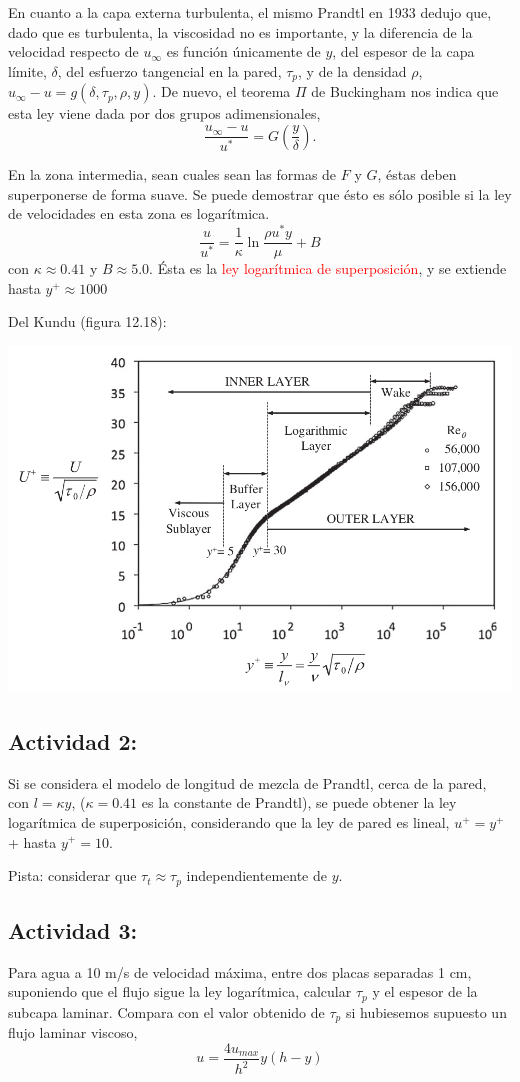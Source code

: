 	
	En cuanto a la capa externa turbulenta, el mismo Prandtl en 1933 dedujo
	que, dado que es turbulenta, la viscosidad no es importante, y la
	diferencia de la velocidad respecto de ${u}_{\infty}$ es función
	únicamente de $y$, del espesor de la capa límite, $\delta$, del
	esfuerzo tangencial en la pared, $\tau_{p}$, y de la densidad $\rho$,
	${u}_{\infty}-u=g(\delta,\tau_{p},\rho,y)$. De nuevo, el teorema
	$\Pi$ de Buckingham nos indica que esta ley viene dada por dos grupos
	adimensionales, 
	\[
	\frac{{u}_{\infty}-u}{u^{*}}=G\left(\frac{y}{\delta}\right).
	\]
	
	En la zona intermedia, sean cuales sean las formas de $F$ y $G$,
	éstas deben superponerse de forma suave. Se puede demostrar que ésto
	es sólo posible si la ley de velocidades en esta zona es logarítmica.
	\[
	\boxed{\frac{u}{u^{*}}=\frac{1}{\kappa}\ln\frac{\rho u^{*}y}{\mu}+B}
	\]
	con $\kappa\approx0.41$ y $B\approx5.0$. Ésta es la \textcolor{red}{ley
		logarítmica de superposición}, y se extiende hasta $y^{+}\approx1000$

	
	Del Kundu\cite{Kundu2012} (figura 12.18):
	
\begin{center}
	\includegraphics[width=0.7\linewidth]{TeX_files/chapter07-Turbulencia/LawOfWall}
\end{center}


	
	\subsection*{Actividad 2:}
		Si se considera el modelo de longitud de mezcla de Prandtl, cerca
		de la pared, con $l=\kappa y$, ($\kappa=0.41$ es la constante de
		Prandtl), se puede obtener la ley logarítmica de superposición, considerando
		que la ley de pared es lineal, $u^{+}=y^{+}$+ hasta $y^{+}=10$.
		
		Pista: considerar que $\tau_{t}\approx\tau_{p}$ independientemente
		de $y$.

	\subsection*{Actividad 3:}
		Para agua a 10 m/s de velocidad máxima, entre dos placas separadas
		1 cm, suponiendo que el flujo sigue la ley logarítmica, calcular $\tau_{p}$
		y el espesor de la subcapa laminar. Compara con el valor obtenido
		de $\tau_{p}$ si hubiesemos supuesto un flujo laminar viscoso, 
		\[
		u=\frac{4u_{max}}{h^{2}}y(h-y)
		\]

